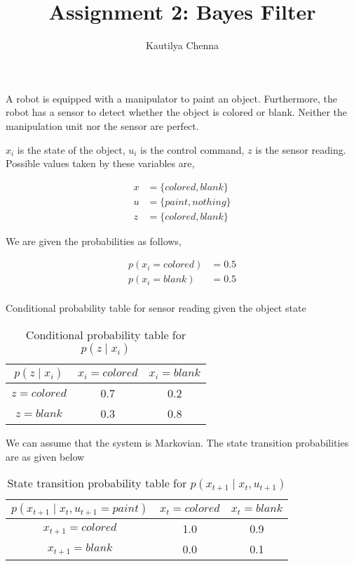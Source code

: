 \documentclass{tufte-handout}
\title{Assignment 2: Bayes Filter}
\author[Kautilya Chenna]{Kautilya Chenna}
\begin{document}
\maketitle%

A robot is equipped with a manipulator to paint an object. 
Furthermore, the robot has a sensor to detect whether the object 
is colored or blank. Neither the manipulation unit nor the 
sensor are perfect.

$x_i$ is the state of the object, $u_i$ is the control command,
$z$ is the sensor reading. Possible values taken by these 
variables are,

\begin{align}
x &= \{colored, blank\}\\
u &= \{paint, nothing\}\\
z &= \{colored, blank\}
\end{align}


We are given the probabilities as follows,

\begin{align}
p(x_i = colored) &= 0.5\\
p(x_i = blank) &= 0.5\\
\end{align}

Conditional probability table for sensor reading given the 
object state

\begin{table}
	\centering
	\begin{tabular}{c | c c}
		$p(z\mid x_i)$& $x_i = colored$ & $x_i = blank$\\
		\hline
		$z = colored$ & 0.7 & 0.2\\
		$z = blank$   & 0.3 & 0.8\\
	\end{tabular}
	\caption{Conditional probability table for $p(z \mid x_i)$}
\end{table}

We can assume that the system is Markovian. The state transition 
probabilities are as given below

\begin{table}
	\centering
	\begin{tabular}{c | c c}
		$p(x_{t+1} \mid x_t, u_{t+1} = paint)$ & $x_t = colored$ & $x_t = blank$\\
		\hline
		$x_{t+1} = colored$ & 1.0 & 0.9\\
		$x_{t+1} = blank$   & 0.0 & 0.1\\
	\end{tabular}
	\caption{State transition probability table for $p(x_{t+1} \mid x_t, u_{t+1})$}
\end{table}
\end{document}
